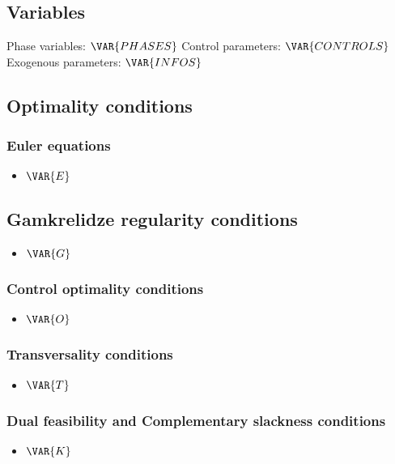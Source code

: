 \documentclass{article}
\begin{document}
\subsection{Variables}

Phase variables: $\VAR{PHASES}$
\newline
Control parameters: $\VAR{CONTROLS}$
\newline
Exogenous parameters: $\VAR{INFOS}$

\subsection{Optimality conditions}
\subsubsection{Euler equations}
\begin{itemize}
    \item $\VAR{E}$
\end{itemize}

\subsection{Gamkrelidze regularity conditions}
\begin{itemize}
    \item $\VAR{G}$
\end{itemize}

\subsubsection{Control optimality conditions}
\begin{itemize}
    \item $\VAR{O}$
\end{itemize}

\subsubsection{Transversality conditions}
\begin{itemize}
    \item $\VAR{T}$
\end{itemize}

\subsubsection{Dual feasibility and Complementary slackness conditions}
\begin{itemize}
    \item $\VAR{K}$
\end{itemize}
\end{document}
